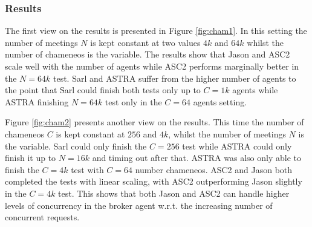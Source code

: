 \subsubsection{Results} 

The first view on the results is presented in Figure \ref{fig:cham1}. In this setting the number of meetings $N$ is kept constant at two values $4k$ and $64k$ whilst the number of chameneos is the variable. The results show that Jason and ASC2 scale well with the number of agents while ASC2 performs marginally better in the $N=64k$ test. Sarl and ASTRA suffer from the higher number of agents to the point that Sarl could finish both tests only up to $C=1k$ agents while ASTRA finishing $N=64k$ test only in the $C=64$ agents setting.

Figure \ref{fig:cham2} presents another view on the results. This time the number of chameneos $C$ is kept constant at $256$ and $4k$, whilst the number of meetings $N$ is the variable. Sarl could only finish the $C=256$ test while ASTRA could only finish it up to $N=16k$ and timing out after that. ASTRA was also only able to finish the $C=4k$ test with $C=64$ number chameneos. ASC2 and Jason both completed the tests with linear scaling, with ASC2 outperforming Jason slightly in the $C=4k$ test. This shows that both Jason and ASC2 can handle higher levels of concurrency in the broker agent w.r.t. the increasing number of concurrent requests.

